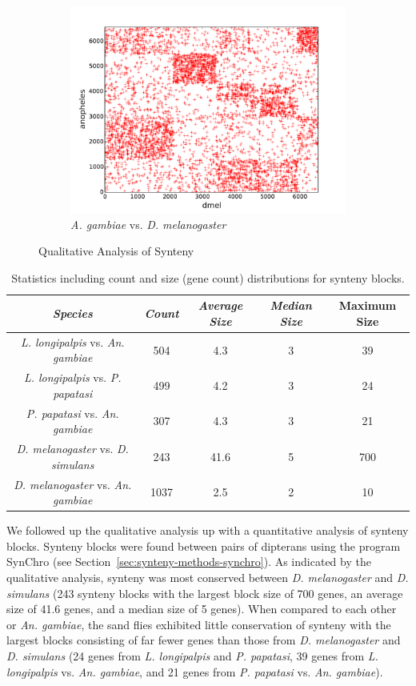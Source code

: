 \begin{figure}[H]
\begin{subfigure}[b]{0.45\textwidth}
    \includegraphics[width=\textwidth]{figures/synteny/dmel_anopheles_plot}
    \caption{\emph{A. gambiae} vs. \emph{D. melanogaster}}
    \label{fig:synteny-dotplots-anopheles-drosophila}
  \end{subfigure}
\label{fig:dot-plots}
\caption{Qualitative Analysis of Synteny}
\end{figure}

\begin{table}[H]
  \centering
  \begin{tabular}{c c c c c} \hline
    \emph{Species} & \emph{Count} & \emph{Average Size} & \emph{Median Size} & {Maximum Size} \\ \hline
    \emph{L. longipalpis} vs. \emph{An. gambiae} & 504 & 4.3 & 3 & 39 \\
    \emph{L. longipalpis} vs. \emph{P. papatasi} & 499 & 4.2 & 3 & 24 \\
    \emph{P. papatasi} vs. \emph{An. gambiae} & 307 & 4.3 & 3 & 21 \\
    \emph{D. melanogaster} vs. \emph{D. simulans} & 243 & 41.6 & 5 & 700 \\
    \emph{D. melanogaster} vs. \emph{An. gambiae} & 1037 & 2.5 & 2 & 10
  \end{tabular}
  \caption{Statistics including count and size (gene count) distributions for synteny blocks.}
  \label{tab:synteny-block-stats}
\end{table}

We followed up the qualitative analysis up with a quantitative analysis of synteny blocks. Synteny blocks were found between pairs of dipterans using the program SynChro (see Section~\ref{sec:synteny-methods-synchro}). As indicated by the qualitative analysis, synteny was most conserved between \emph{D. melanogaster} and \emph{D. simulans} (243 synteny blocks with the largest block size of 700 genes, an average size of 41.6 genes, and a median size of 5 genes).  When compared to each other or \emph{An. gambiae}, the sand flies exhibited little conservation of synteny with the largest blocks consisting of far fewer genes than those from \emph{D. melanogaster} and \emph{D. simulans} (24 genes from \emph{L. longipalpis} and \emph{P. papatasi}, 39 genes from \emph{L. longipalpis} vs. \emph{An. gambiae}, and 21 genes from \emph{P. papatasi} vs. \emph{An. gambiae}).

